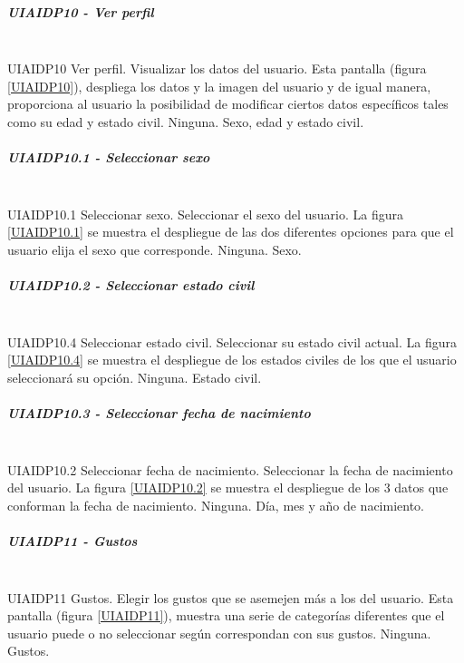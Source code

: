 \subparagraph{UIAIDP10 - Ver perfil} ~\\
\FloatBarrier
{} %
{UIAIDP10} %
{Ver perfil.}  %
{Visualizar los datos del usuario.} %
{Esta pantalla (figura \ref{UIAIDP10}), despliega los datos y la imagen del usuario y de igual manera, proporciona al usuario la posibilidad de modificar ciertos datos específicos tales como su edad y estado civil.} %
{Ninguna.} %
{Sexo, edad y estado civil.} %
\FloatBarrier

\subparagraph{UIAIDP10.1 - Seleccionar sexo} ~\\
\FloatBarrier
{} %
{UIAIDP10.1} %
{Seleccionar sexo.}  %
{Seleccionar el sexo del usuario.} %
{La figura \ref{UIAIDP10.1} se muestra el despliegue de las dos diferentes opciones para que el usuario elija el sexo que corresponde.} %
{Ninguna.} %
{Sexo.} %
\FloatBarrier

\subparagraph{UIAIDP10.2 - Seleccionar estado civil} ~\\
\FloatBarrier
{} %
{UIAIDP10.4} %
{Seleccionar estado civil.}  %
{Seleccionar su estado civil actual.} %
{La figura \ref{UIAIDP10.4} se muestra el despliegue de los estados civiles de los que el usuario seleccionará su opción.} %
{Ninguna.} %
{Estado civil.} %
\FloatBarrier


\subparagraph{UIAIDP10.3 - Seleccionar fecha de nacimiento} ~\\
\FloatBarrier
{} %
{UIAIDP10.2} %
{Seleccionar fecha de nacimiento.}  %
{Seleccionar la fecha de nacimiento del usuario.} %
{La figura \ref{UIAIDP10.2} se muestra el despliegue de los 3 datos que conforman la fecha de nacimiento.} %
{Ninguna.} %
{Día, mes y año de nacimiento.} %
\FloatBarrier

\subparagraph{UIAIDP11 - Gustos} ~\\
\FloatBarrier
{} %
{UIAIDP11} %
{Gustos.}  %
{Elegir los gustos que se asemejen más a los del usuario.} %
{Esta pantalla (figura \ref{UIAIDP11}), muestra una serie de categorías diferentes que el usuario puede o no seleccionar según correspondan con sus gustos.} %
{Ninguna.} %
{Gustos.} %
\FloatBarrier

